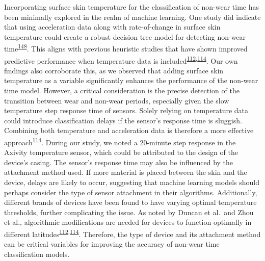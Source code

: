 \documentclass[
  10pt,
]{scrbook}
\begin{document}
Incorporating surface skin temperature for the classification of
non-wear time has been minimally explored in the realm of machine
learning. One study did indicate that using acceleration data along with
rate-of-change in surface skin temperature could create a robust
decision tree model for detecting non-wear
time\textsuperscript{\protect\hyperlink{ref-vert_detecting_2022}{148}}.
This aligns with previous heuristic studies that have shown improved
predictive performance when temperature data is
included\textsuperscript{\protect\hyperlink{ref-duncan_wear-time_2018}{112},\protect\hyperlink{ref-zhou_classification_2015}{114}}.
Our own findings also corroborate this, as we observed that adding
surface skin temperature as a variable significantly enhances the
performance of the non-wear time model. However, a critical
consideration is the precise detection of the transition between wear
and non-wear periods, especially given the slow temperature step
response time of sensors. Solely relying on temperature data could
introduce classification delays if the sensor's response time is
sluggish. Combining both temperature and acceleration data is therefore
a more effective
approach\textsuperscript{\protect\hyperlink{ref-zhou_classification_2015}{114}}.
During our study, we noted a 20-minute step response in the Axivity
temperature sensor, which could be attributed to the design of the
device's casing. The sensor's response time may also be influenced by
the attachment method used. If more material is placed between the skin
and the device, delays are likely to occur, suggesting that machine
learning models should perhaps consider the type of sensor attachment in
their algorithms. Additionally, different brands of devices have been
found to have varying optimal temperature thresholds, further
complicating the issue. As noted by Duncan et al.~and Zhou et al.,
algorithmic modifications are needed for devices to function optimally
in different
latitudes\textsuperscript{\protect\hyperlink{ref-duncan_wear-time_2018}{112},\protect\hyperlink{ref-zhou_classification_2015}{114}}.
Therefore, the type of device and its attachment method can be critical
variables for improving the accuracy of non-wear time classification
models.
\end{document}
